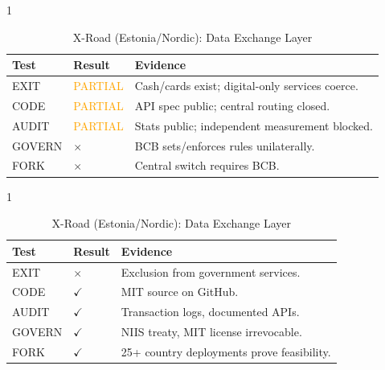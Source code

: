 \documentclass{article}
\begin{document}
\begin{table}[p]
    \begin{subtable}{1\textwidth}
        \centering
        \caption{Pix (Brazil): Central Bank Payment}
        \begin{tabular}{@{}llp{7cm}@{}}
            \toprule
            \textbf{Test} & \textbf{Result} & \textbf{Evidence} \\
            \midrule
            EXIT & \textcolor{orange}{PARTIAL} & Cash/cards exist; digital-only services coerce. \\
            CODE & \textcolor{orange}{PARTIAL} & API spec public; central routing closed. \\
            AUDIT & \textcolor{orange}{PARTIAL} & Stats public; independent measurement blocked. \\
            GOVERN & $\times$ & BCB sets/enforces rules unilaterally. \\
            FORK & $\times$ & Central switch requires BCB. \\
            \bottomrule
        \end{tabular}
    \end{subtable}

    \begin{subtable}{1\textwidth}
        \centering
        \caption{X-Road (Estonia/Nordic): Data Exchange Layer}
        \begin{tabular}{@{}llp{7cm}@{}}
            \toprule
            \textbf{Test} & \textbf{Result} & \textbf{Evidence} \\
            \midrule
            EXIT & $\times$ & Exclusion from government services. \\
            CODE & $\checkmark$ & MIT source on GitHub. \\
            AUDIT & $\checkmark$ & Transaction logs, documented APIs. \\
            GOVERN & $\checkmark$ & NIIS treaty, MIT license irrevocable. \\
            FORK & $\checkmark$ & 25+ country deployments prove feasibility. \\
            \bottomrule
        \end{tabular}
    \end{subtable}


\end{table}
\end{document}
